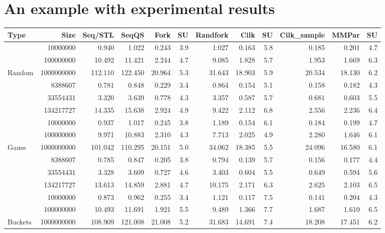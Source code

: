 \documentclass[preprint]{sigplanconf}
\begin{document}
\section{An example with experimental results}
\label{sec:quicksort}

\begin{table*}[t!]
\begin{center}
\begin{tabular}{|lr|rr|rrr|rrr||rr|}
\hline
Type & Size & Seq/STL & SeqQS & Fork & SU & Randfork & Cilk & SU & Cilk\_sample & MMPar & SU \\
\hline
 & 10000000 & 0.940 & 1.022 & 0.243 & 3.9 & 1.027 & 0.163 & 5.8 & 0.185 & 0.201 & 4.7 \\
 & 100000000 & 10.492 & 11.421 & 2.244 & 4.7 & 9.085 & 1.828 & 5.7 & 1.953 & 1.669 & 6.3 \\
Random & 1000000000 & 112.110 & 122.450 & 20.964 & 5.3 & 31.643 & 18.903 & 5.9 & 20.534 & 18.130 & 6.2 \\
 & 8388607 & 0.781 & 0.848 & 0.229 & 3.4 & 0.864 & 0.154 & 5.1 & 0.158 & 0.182 & 4.3 \\
 & 33554431 & 3.320 & 3.639 & 0.778 & 4.3 & 3.357 & 0.587 & 5.7 & 0.681 & 0.603 & 5.5 \\
 & 134217727 & 14.335 & 15.638 & 2.924 & 4.9 & 9.422 & 2.112 & 6.8 & 2.556 & 2.236 & 6.4 \\
\hline
 & 10000000 & 0.937 & 1.017 & 0.245 & 3.8 & 1.189 & 0.154 & 6.1 & 0.184 & 0.199 & 4.7 \\
 & 100000000 & 9.971 & 10.883 & 2.310 & 4.3 & 7.713 & 2.025 & 4.9 & 2.280 & 1.646 & 6.1 \\
Gauss & 1000000000 & 101.042 & 110.295 & 20.151 & 5.0 & 34.062 & 18.385 & 5.5 & 24.096 & 16.580 & 6.1 \\
 & 8388607 & 0.785 & 0.847 & 0.205 & 3.8 & 0.794 & 0.139 & 5.7 & 0.156 & 0.177 & 4.4 \\
 & 33554431 & 3.328 & 3.609 & 0.727 & 4.6 & 3.403 & 0.604 & 5.5 & 0.649 & 0.594 & 5.6 \\
 & 134217727 & 13.613 & 14.859 & 2.881 & 4.7 & 10.175 & 2.171 & 6.3 & 2.625 & 2.103 & 6.5 \\
\hline
 & 10000000 & 0.873 & 0.962 & 0.255 & 3.4 & 1.121 & 0.117 & 7.5 & 0.141 & 0.204 & 4.3 \\
 & 100000000 & 10.493 & 11.691 & 1.921 & 5.5 & 9.489 & 1.366 & 7.7 & 1.687 & 1.610 & 6.5 \\
Buckets & 1000000000 & 108.909 & 121.008 & 21.008 & 5.2 & 31.683 & 14.691 & 7.4 & 18.208 & 17.451 & 6.2 \\

\end{tabular}
\end{center}
\end{table*}
\end{document}
